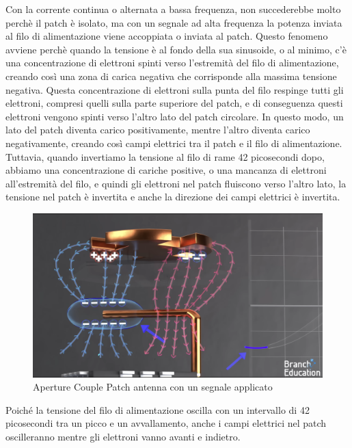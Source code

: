 Con la corrente continua o alternata a bassa frequenza, non succederebbe molto perchè il patch è isolato, ma con un segnale ad alta frequenza la potenza inviata al filo di alimentazione viene accoppiata o inviata al patch.
Questo fenomeno avviene perchè quando la tensione è al fondo della sua sinusoide, o al minimo, c'è una concentrazione di elettroni spinti verso l'estremità del filo di alimentazione, creando così una zona di carica negativa che corrisponde alla massima tensione negativa.
Questa concentrazione di elettroni sulla punta del filo respinge tutti gli elettroni, compresi quelli sulla parte superiore del patch, e di conseguenza questi elettroni vengono spinti verso l'altro lato del patch circolare.
In questo modo, un lato del patch diventa carico positivamente, mentre l'altro diventa carico negativamente, creando così campi elettrici tra il patch e il filo di alimentazione.
Tuttavia, quando invertiamo la tensione al filo di rame 42 picosecondi dopo, abbiamo una concentrazione di cariche positive, o una mancanza di elettroni all'estremità del filo, e quindi gli elettroni nel patch fluiscono verso l'altro lato, la tensione nel patch è invertita e anche la direzione dei campi elettrici è invertita.\cite{branch_education_how_2022}

\begin{figure}[htbp]
  \centering
  \includegraphics[width=0.8\linewidth]{./res/img/antenna_voltage_applied.png}
  \caption{Aperture Couple Patch antenna con un segnale applicato \cite{branch_education_how_2022}}
  \label{fig:aperture-couple-patch-antenna-voltage-applied}
\end{figure}

Poiché la tensione del filo di alimentazione oscilla con un intervallo di 42 picosecondi tra un picco e un avvallamento, anche i campi elettrici nel patch oscilleranno mentre gli elettroni vanno avanti e indietro.

